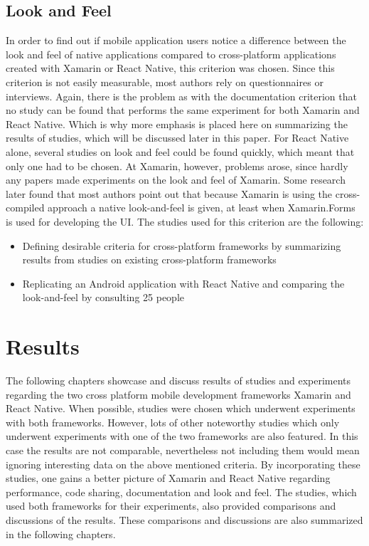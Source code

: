 \documentclass[Bachelor,BIF,english]{twbook}
\begin{document}
\subsection{Look and Feel}
In order to find out if mobile application users notice a difference between the look and feel of native applications compared to cross-platform applications created with Xamarin or React Native, this criterion was chosen. Since this criterion is not easily measurable, most authors rely on questionnaires or interviews. 
Again, there is the problem as with the documentation criterion that no study can be found that performs the same experiment for both Xamarin and React Native. Which is why more emphasis is placed here on summarizing the results of studies, which will be discussed later in this paper. For React Native alone, several studies on look and feel could be found quickly, which meant that only one had to be chosen. At Xamarin, however, problems arose, since hardly any papers made experiments on the look and feel of Xamarin. Some research later found that most authors point out that because Xamarin is using the cross-compiled approach a native look-and-feel is given, at least when Xamarin.Forms is used for developing the UI.
The studies used for this criterion are the following:
\begin{itemize}
\item Defining desirable criteria for cross-platform frameworks by summarizing results from studies on existing cross-platform frameworks\cite[p.~21]{GaouarBenamarBendimerad2016} \cite[p.~8]{tunali2015comparison}
\item Replicating an Android application with React Native and comparing the look-and-feel by consulting 25 people \cite[p.~16-18]{Danielsson_2016}
\end{itemize}

\section{Results}
The following chapters showcase and discuss results of studies and experiments regarding the two cross platform mobile development frameworks Xamarin and React Native. When possible, studies were chosen which underwent experiments with both frameworks. However, lots of other noteworthy studies which only underwent experiments with one of the two frameworks are also featured. In this case the results are not comparable, nevertheless not including them would mean ignoring interesting data on the above mentioned criteria. By incorporating these studies, one gains a better picture of Xamarin and React Native regarding performance, code sharing, documentation and look and feel. The studies, which used both frameworks for their experiments, also provided comparisons and discussions of the results. These comparisons and discussions are also summarized in the following chapters.
\end{document}
